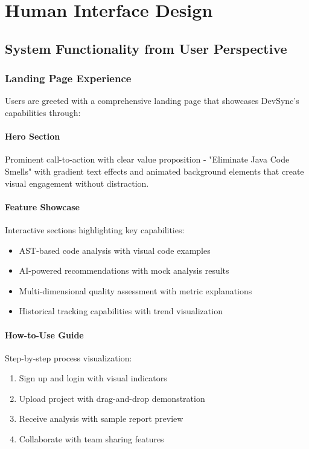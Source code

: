 \documentclass[12pt,a4paper]{article}
\begin{document}
    \section{Human Interface Design}

    \subsection{System Functionality from User Perspective}

    \subsubsection{Landing Page Experience}

    Users are greeted with a comprehensive landing page that showcases DevSync's capabilities through:

    \paragraph{Hero Section}
    Prominent call-to-action with clear value proposition - "Eliminate Java Code Smells" with gradient text effects and animated background elements that create visual engagement without distraction.

    \paragraph{Feature Showcase}
    Interactive sections highlighting key capabilities:
    \begin{itemize}[leftmargin=0.5in]
        \item AST-based code analysis with visual code examples
        \item AI-powered recommendations with mock analysis results
        \item Multi-dimensional quality assessment with metric explanations
        \item Historical tracking capabilities with trend visualization
    \end{itemize}

    \paragraph{How-to-Use Guide}
    Step-by-step process visualization:
    \begin{enumerate}[leftmargin=0.7in]
        \item Sign up and login with visual indicators
        \item Upload project with drag-and-drop demonstration
        \item Receive analysis with sample report preview
        \item Collaborate with team sharing features
    \end{enumerate}
\end{document}
